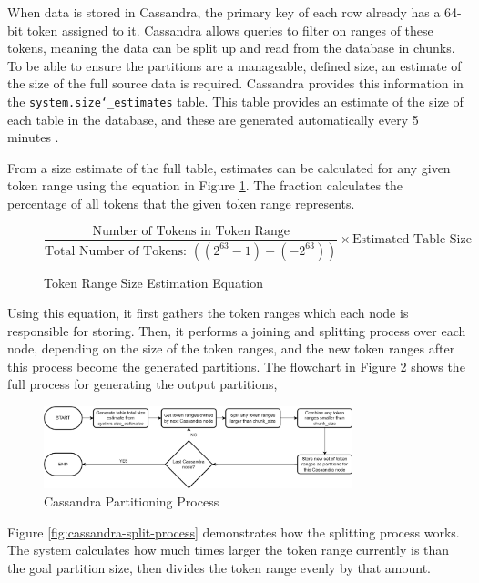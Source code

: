 When data is stored in Cassandra, the primary key of each row already has a 64-bit token assigned to it. Cassandra allows queries to filter on ranges of these tokens, meaning the data can be split up and read from the database in chunks. To be able to ensure the partitions are a manageable, defined size, an estimate of the size of the full source data is required. Cassandra provides this information in the \texttt{system.size\char`_estimates} table. This table provides an estimate of the size of each table in the database, and these are generated automatically every 5 minutes .

From a size estimate of the full table, estimates can be calculated for any given token range using the equation in Figure \ref{fig:token-range-estimation}. The fraction calculates the percentage of all tokens that the given token range represents.

\begin{figure}[h]
	\centering
	\[ \frac{\text{Number of Tokens in Token Range}}{\text{Total Number of Tokens: } ((2^{63}-1) - (-2^{63}))} \times \text{Estimated Table Size} \]
	\caption{Token Range Size Estimation Equation}
	\label{fig:token-range-estimation}
\end{figure}

Using this equation, it first gathers the token ranges which each node is responsible for storing. Then, it performs a joining and splitting process over each node, depending on the size of the token ranges, and the new token ranges after this process become the generated partitions. The flowchart in Figure \ref{fig:cassandra-partitioning-decision-tree} shows the full process for generating the output partitions, 

\begin{figure}[h]
	\centering
	\includegraphics[width=0.8\textwidth]{chapters/diagrams/implementation/cassandra-partitioning-decision-tree}
	\caption{Cassandra Partitioning Process}
	\label{fig:cassandra-partitioning-decision-tree}
\end{figure}


Figure \ref{fig:cassandra-split-process} demonstrates how the splitting process works. The system calculates how much times larger the token range currently is than the goal partition size, then divides the token range evenly by that amount.

